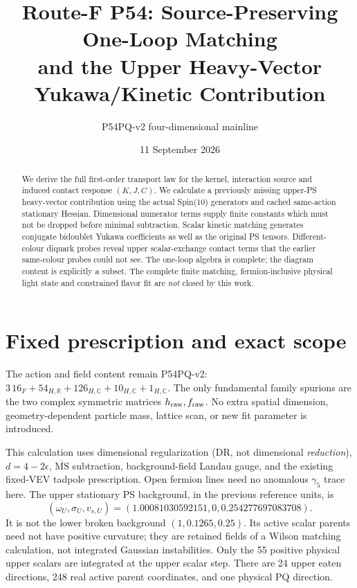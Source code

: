 \documentclass[11pt]{article}
\title{Route-F P54: Source-Preserving One-Loop Matching\\
and the Upper Heavy-Vector Yukawa/Kinetic Contribution}
\author{P54PQ-v2 four-dimensional mainline}
\date{11 September 2026}
\newcommand{\MS}{\overline{\mathrm{MS}}}
\begin{document}
\maketitle
\begin{abstract}
We derive the full first-order transport law for the kernel, interaction
source and induced contact response $(K,J,C)$. We calculate a previously
missing upper-PS heavy-vector contribution using the actual Spin(10)
generators and cached same-action stationary Hessian. Dimensional
numerator terms supply finite constants which must not be dropped before
minimal subtraction. Scalar kinetic matching generates conjugate
bidoublet Yukawa coefficients as well as the original PS tensors.
Different-colour diquark probes reveal upper scalar-exchange contact
terms that the earlier same-colour probes could not see.
The one-loop algebra is complete; the diagram content is explicitly a
subset. The complete finite matching, fermion-inclusive physical light
state and constrained flavor fit are \emph{not} closed by this work.
\end{abstract}

\section{Fixed prescription and exact scope}
The action and field content remain P54PQ-v2:
$3\,16_F+54_{H,\mathbb R}+126_{H,\mathbb C}+10_{H,\mathbb C}
+1_{H,\mathbb C}$. The only fundamental family spurions are the two
complex symmetric matrices $h_{\rm raw},f_{\rm raw}$. No extra spatial
dimension, geometry-dependent particle mass, lattice scan, or new fit
parameter is introduced.

This calculation uses dimensional regularization (DR, not dimensional
\emph{reduction}), $d=4-2\epsilon$, $\MS$ subtraction, background-field
Landau gauge, and the existing fixed-VEV tadpole prescription. Open
fermion lines need no anomalous $\gamma_5$ trace here. The upper stationary
PS background, in the previous reference units, is
\begin{equation}
 (\omega_U,\sigma_U,v_{s,U})=
 (1.00081030592151,0,0.254277697083708).
\end{equation}
It is not the lower broken background $(1,0.1265,0.25)$. Its active
scalar parents need not have positive curvature; they are retained fields
of a Wilson matching calculation, not integrated Gaussian instabilities.
Only the 55 positive physical upper scalars are integrated at the upper
scalar step. There are 24 upper eaten directions, 248 real active parent
coordinates, and one physical PQ direction.
\end{document}
